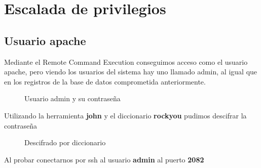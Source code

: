 \documentclass[a4paper]{article}
\begin{document}
\section{Escalada de privilegios}
\subsection{Usuario apache}
Mediante el Remote Command Execution conseguimos acceso como el usuario apache, 
pero viendo los usuarios del sistema hay uno llamado admin, al igual que en los
registros de la base de datos comprometida anteriormente.

\begin{figure}[H]
  \centering
  \setlength{\fboxrule}{0.8pt}
  \caption{Usuario admin y su contraseña}
\end{figure}
\vspace{0.4cm}

Utilizando la herramienta \textbf{john} y el diccionario \textbf{rockyou} pudimos
descifrar la contraseña

\begin{figure}[H]
  \centering
  \setlength{\fboxrule}{0.8pt}
  \caption{Descifrado por diccionario}
\end{figure}
\vspace{0.4cm}

Al probar conectarnos por ssh al usuario \textbf{admin} al puerto \textbf{2082}
\vspace{0.4cm}
\end{document}
